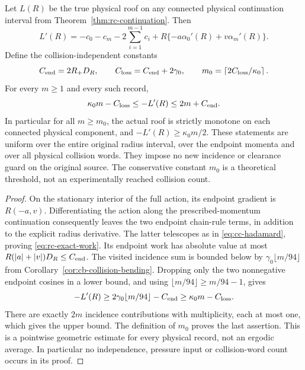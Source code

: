 \begin{theorem}
\label{thm:rc-clock}
Let $L(R)$ be the true physical roof on any connected physical
continuation interval from Theorem~\ref{thm:rc-continuation}.
Then
\begin{equation}\label{eq:rc-exact-work}
 L'(R)=-c_0-c_m-2\sum_{i=1}^{m-1}c_i
             +R\{-a\alpha_0'(R)+v\alpha_m'(R)\}.
\end{equation}
Define the collision-independent constants
\[
 C_{\rm end}=2R_+D_R,\qquad C_{\rm loss}=C_{\rm end}+2\gamma_0,
 \qquad m_0=\left\lceil2C_{\rm loss}/\kappa_0\right\rceil.
\]
For every $m\geq1$ and every such record,
\begin{equation}\label{eq:rc-full-slope}
 \kappa_0m-C_{\rm loss}\leq -L'(R)\leq2m+C_{\rm end}.
\end{equation}
In particular for all $m\geq m_0$, the actual roof is strictly
monotone on each connected physical component, and
$-L'(R)\geq\kappa_0m/2$.  These statements are uniform over the
entire original radius interval, over the endpoint momenta and over
all physical collision words.  They impose no new incidence or
clearance guard on the original source.  The conservative constant
$m_0$ is a theoretical threshold, not an experimentally reached
collision count.
\end{theorem}
\begin{proof}
On the stationary interior of the full action, its endpoint gradient
is $R(-a,v)$.  Differentiating the action along the prescribed-momentum
continuation consequently leaves the two endpoint chain-rule terms,
in addition to the explicit radius derivative.  The latter telescopes
as in \eqref{eq:cc-hadamard}, proving \eqref{eq:rc-exact-work}.
Its endpoint work has absolute value at most
$R(|a|+|v|)D_R\leq C_{\rm end}$.
The visited incidence sum is bounded below by
$\gamma_0\lfloor m/94\rfloor$ from
Corollary~\ref{cor:cb-collision-bending}.  Dropping only the two
nonnegative endpoint cosines in a lower bound, and using
$\lfloor m/94\rfloor\geq m/94-1$, gives
\[
 -L'(R)\geq 2\gamma_0\lfloor m/94\rfloor-C_{\rm end}
          \geq\kappa_0m-C_{\rm loss}.
\]
There are exactly $2m$ incidence contributions with multiplicity,
each at most one, which gives the upper bound.  The definition of
$m_0$ proves the last assertion.  This is a pointwise geometric
estimate for every physical record, not an ergodic average.  In
particular no independence, pressure input or collision-word count
occurs in its proof.
\end{proof}

